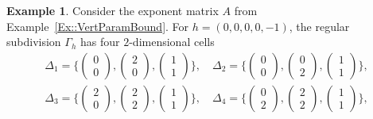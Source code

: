 \documentclass{article}
\theoremstyle{definition}
\newtheorem{example}[theorem]{Example}
\begin{document}
\begin{example}
\label{Ex::SubDivision}
    Consider the exponent matrix $A$ from Example~\ref{Ex::VertParamBound}. For $h = (0,0,0,0,-1)$, the regular subdivision $\Gamma_h$ has four  $2$-dimensional cells
    \begin{align*}
\Delta_1 = \Big\{ \begin{pmatrix}
        0\\
        0
    \end{pmatrix} ,\begin{pmatrix}
        2\\
        0
    \end{pmatrix}, \begin{pmatrix}
        1\\
        1
    \end{pmatrix}\Big\}, \quad \Delta_2 = \Big\{ \begin{pmatrix}
        0\\
        0
    \end{pmatrix} ,\begin{pmatrix}
        0\\
        2
    \end{pmatrix}, \begin{pmatrix}
        1\\
        1
    \end{pmatrix}\Big\}, \\
    \Delta_3 = \Big\{ \begin{pmatrix}
        2\\
        0
    \end{pmatrix} ,\begin{pmatrix}
        2\\
        2
    \end{pmatrix}, \begin{pmatrix}
        1\\
        1
    \end{pmatrix}\Big\}, \quad \Delta_4 = \Big\{ \begin{pmatrix}
        0\\
        2
    \end{pmatrix} ,\begin{pmatrix}
        2\\
        2
    \end{pmatrix}, \begin{pmatrix}
        1\\
        1
    \end{pmatrix}\Big\},
    \end{align*}

\end{example}
\end{document}

